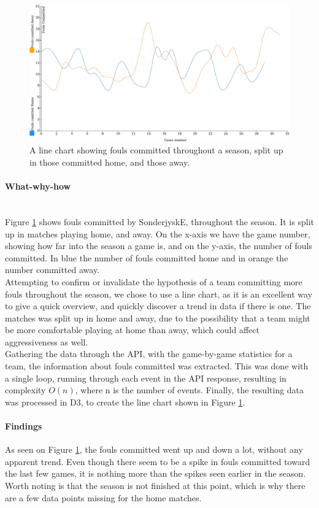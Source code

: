 \documentclass[Report.tex]{subfiles}
\begin{document}
\begin{figure}
\center
\includegraphics[width=\textwidth]{Figures/fouls.pdf}
\caption{A line chart showing fouls committed throughout a season, split up in those committed home, and those away.}
\label{Fig:FOULS}
\end{figure}


\paragraph{What-why-how\\\\}
Figure \ref{Fig:FOULS} shows fouls committed by SonderjyskE, throughout the season. It is split up in matches playing home, and away. On the x-axis we have the game number, showing how far into the season a game is, and on the y-axis, the number of fouls committed. In blue the number of fouls committed home and in orange the number committed away.\\

Attempting to confirm or invalidate the hypothesis of a team committing more fouls throughout the season, we chose to use a line chart, as it is an excellent way to give a quick overview, and quickly discover a trend in data if there is one. The matches was split up in home and away, due to the possibility that a team might be more comfortable playing at home than away, which could affect aggressiveness as well.\\

Gathering the data through the API, with the game-by-game statistics for a team, the information about fouls committed was extracted. This was done with a single loop, running through each event in the API response, resulting in complexity $O(n)$, where n is the number of events. Finally, the resulting data was processed in D3, to create the line chart shown in Figure \ref{Fig:FOULS}.

\paragraph{Findings\\}
As seen on Figure \ref{Fig:FOULS}, the fouls committed went up and down a lot, without any apparent trend. Even though there seem to be a spike in fouls committed toward the last few games, it is nothing more than the spikes seen earlier in the season. Worth noting is that the season is not finished at this point, which is why there are a few data points missing for the home matches.
\end{document}
